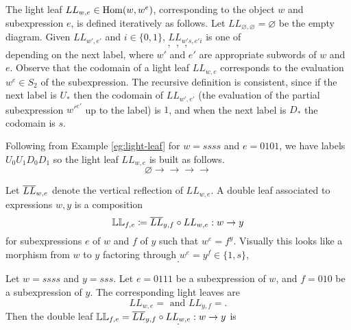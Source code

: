 The light leaf $LL_{w,e} \in \operatorname{Hom}(w, w^e)$, corresponding to the object $w$ and subexpression $e$, is defined iteratively as follows. Let $LL_{\varnothing,\varnothing} = \varnothing$ be the empty diagram. Given $LL_{w',e'}$ and $i \in \{0,1\}$, $LL_{w's,e'i}$ is one of
\begin{equation}
     \:,\:
     \:,\:
     \:,\:
    
\end{equation}
depending on the next label, where $w'$ and $e'$ are appropriate subwords of $w$ and $e$. Observe that the codomain of a light leaf $LL_{w,e}$ corresponds to the evaluation $w^e \in S_2$ of the subexpression. The recursive definition is consistent, since if the next label is $U_*$ then the codomain of $LL_{w',e'}$ (the evaluation of the partial subexpression $w'^{e'}$ up to the label) is $1$, and when the next label is $D_*$ the codomain is $s$. 

\begin{example}
    Following from Example \eqref{eg:light-leaf} for $w = ssss$ and $e = 0101$, we have labels $U_0 U_1 D_0 D_1$ so the light leaf $LL_{w,e}$ is built as follows.
    \[
        \varnothing
        \to 
        \to 
        \to 
        \to 
    \]
\end{example}

Let $\overline{LL}_{w,e}$ denote the vertical reflection of $LL_{w,e}$. A double leaf associated to expressions $w,y$ is a composition
\[
    \mathbb{LL}_{f,e} \coloneqq \overline{LL}_{y,f} \circ LL_{w,e} : w \to y
\]
for subexpressions $e$ of $w$ and $f$ of $y$ such that $w^e = f^y$. Visually this looks like a morphism from $w$ to $y$ factoring through $w^e = y^f \in \{1,s\}$,
\[
    .
\]

\begin{example}
    Let $w = ssss$ and $y = sss$. Let $e=0111$ be a subexpression of $w$, and $f=010$ be a subexpression of $y$. The corresponding light leaves are
    \[
        LL_{w,e} = 
        \text{ and }
        LL_{y,f} = .
    \]
    Then the double leaf $\mathbb{LL}_{f,e} = \overline{LL}_{y,f} \circ LL_{w,e} : w \to y$ is
    \[
        .
    \]
\end{example}

